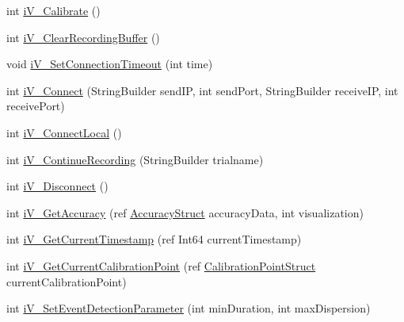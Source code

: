 \begin{DoxyCompactItemize}
\item 
int \hyperlink{class_web_analyzer_1_1_eye_tracking_1_1_eye_tracking_controller_a56b96b62dfc65f984477f7acd2e4fe13}{i\+V\+\_\+\+Calibrate} ()
\item 
int \hyperlink{class_web_analyzer_1_1_eye_tracking_1_1_eye_tracking_controller_a9aa939927f5998f02a2fa7e37a01cefd}{i\+V\+\_\+\+Clear\+Recording\+Buffer} ()
\item 
void \hyperlink{class_web_analyzer_1_1_eye_tracking_1_1_eye_tracking_controller_ab11438196fedd13ec1ceae9a024add76}{i\+V\+\_\+\+Set\+Connection\+Timeout} (int time)
\item 
int \hyperlink{class_web_analyzer_1_1_eye_tracking_1_1_eye_tracking_controller_af260b9bc9e30b804be82aa597f4013fb}{i\+V\+\_\+\+Connect} (String\+Builder send\+I\+P, int send\+Port, String\+Builder receive\+I\+P, int receive\+Port)
\item 
int \hyperlink{class_web_analyzer_1_1_eye_tracking_1_1_eye_tracking_controller_ae1790b847e4c73c0e7ddb5e6f8361255}{i\+V\+\_\+\+Connect\+Local} ()
\item 
int \hyperlink{class_web_analyzer_1_1_eye_tracking_1_1_eye_tracking_controller_a00511d2099b9c1b0f9788972674b7492}{i\+V\+\_\+\+Continue\+Recording} (String\+Builder trialname)
\item 
int \hyperlink{class_web_analyzer_1_1_eye_tracking_1_1_eye_tracking_controller_a4fc587029ac9b79c48700b35c619f733}{i\+V\+\_\+\+Disconnect} ()
\item 
int \hyperlink{class_web_analyzer_1_1_eye_tracking_1_1_eye_tracking_controller_a9cad9ddc1372e8bf197490be9f56dac2}{i\+V\+\_\+\+Get\+Accuracy} (ref \hyperlink{struct_web_analyzer_1_1_eye_tracking_1_1_eye_tracking_controller_1_1_accuracy_struct}{Accuracy\+Struct} accuracy\+Data, int visualization)
\item 
int \hyperlink{class_web_analyzer_1_1_eye_tracking_1_1_eye_tracking_controller_a03104a5a59f13194ae628b71bc7ea8ff}{i\+V\+\_\+\+Get\+Current\+Timestamp} (ref Int64 current\+Timestamp)
\item 
int \hyperlink{class_web_analyzer_1_1_eye_tracking_1_1_eye_tracking_controller_a2faf624f65dbfbeed059545d58901680}{i\+V\+\_\+\+Get\+Current\+Calibration\+Point} (ref \hyperlink{struct_web_analyzer_1_1_eye_tracking_1_1_eye_tracking_controller_1_1_calibration_point_struct}{Calibration\+Point\+Struct} current\+Calibration\+Point)
\item 
int \hyperlink{class_web_analyzer_1_1_eye_tracking_1_1_eye_tracking_controller_a1d15a969f46265e3e3c8baec4e4900a7}{i\+V\+\_\+\+Set\+Event\+Detection\+Parameter} (int min\+Duration, int max\+Dispersion)

\end{DoxyCompactItemize}
